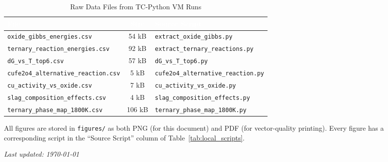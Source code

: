 \documentclass[11pt]{article}
\begin{document}
\begin{table}[H]
\caption{Raw Data Files from TC-Python VM Runs}
\label{tab:data_files}
\centering
\renewcommand{\arraystretch}{1.15}
\footnotesize
\begin{tabular}{|p{2.8in}|c|p{2.2in}|}
\hline
\rowcolor{headercolor}
\textcolor{white}{\textbf{File}} & \textcolor{white}{\textbf{Size}} & \textcolor{white}{\textbf{Source Script}} \\
\hline
\texttt{oxide\_gibbs\_energies.csv} & 54 kB & \texttt{extract\_oxide\_gibbs.py} \\
\hline
\rowcolor{altrow}
\texttt{ternary\_reaction\_energies.csv} & 92 kB & \texttt{extract\_ternary\_reactions.py} \\
\hline
\texttt{dG\_vs\_T\_top6.csv} & 57 kB & \texttt{dG\_vs\_T\_top6.py} \\
\hline
\rowcolor{altrow}
\texttt{cufe2o4\_alternative\_reaction.csv} & 5 kB & \texttt{cufe2o4\_alternative\_reaction.py} \\
\hline
\texttt{cu\_activity\_vs\_oxide.csv} & 7 kB & \texttt{cu\_activity\_vs\_oxide.py} \\
\hline
\rowcolor{altrow}
\texttt{slag\_composition\_effects.csv} & 4 kB & \texttt{slag\_composition\_effects.py} \\
\hline
\texttt{ternary\_phase\_map\_1800K.csv} & 106 kB & \texttt{ternary\_phase\_map\_1800K.py} \\
\hline
\end{tabular}
\end{table}

All figures are stored in \texttt{figures/} as both PNG (for this document) and PDF (for vector-quality printing). Every figure has a corresponding script in the ``Source Script'' column of Table~\ref{tab:local_scripts}.


\vfill
\begin{center}
\textit{Last updated: \today}
\end{center}
\end{document}
